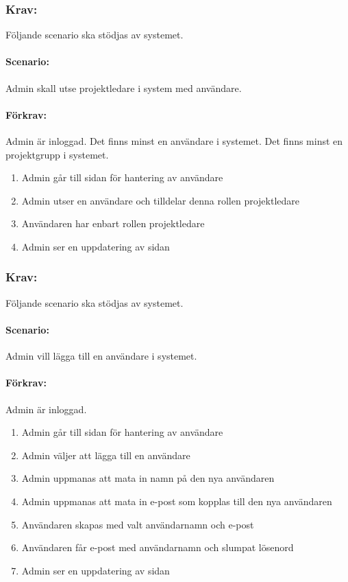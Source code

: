 \documentclass[paper=a4, fontsize=11pt,twoside]{article}
\begin{document}
\subsubsection{Krav:} Följande scenario ska stödjas av systemet. 
\paragraph{Scenario:}
Admin skall utse projektledare i system med användare.
\paragraph{Förkrav:}
Admin är inloggad. Det finns minst en användare i systemet. Det finns minst en projektgrupp i systemet.
\begin{enumerate}
\item Admin går till sidan för hantering av användare
\item Admin utser en användare och tilldelar denna rollen projektledare
\item Användaren har enbart rollen projektledare
\item Admin ser en uppdatering av sidan
\end{enumerate}

\subsubsection{Krav:} Följande scenario ska stödjas av systemet. 
\paragraph{Scenario:}
Admin vill lägga till en användare i systemet.
\paragraph{Förkrav:}
Admin är inloggad. 
\begin{enumerate}
\item Admin går till sidan för hantering av användare
\item Admin väljer att lägga till en användare
\item Admin uppmanas att mata in namn på den nya användaren
\item Admin uppmanas att mata in e-post som kopplas till den nya användaren
\item Användaren skapas med valt användarnamn och e-post
\item Användaren får e-post med användarnamn och slumpat lösenord
\item Admin ser en uppdatering av sidan
\end{enumerate}
\end{document}
